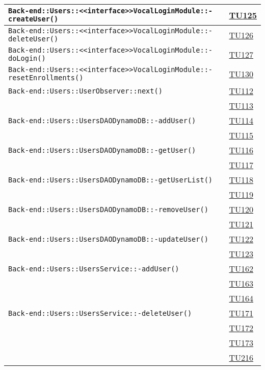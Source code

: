 \begin{longtable}{|>{\centering}m{12cm}|m{1cm}<{\centering}|}
\texttt{Back-end::Users::<<interface>>VocalLoginModule::-\linebreak createUser()} & \hyperlink{TU125}{TU125}\\ \hline
\texttt{Back-end::Users::<<interface>>VocalLoginModule::-\linebreak deleteUser()} & \hyperlink{TU126}{TU126}\\ \hline
\texttt{Back-end::Users::<<interface>>VocalLoginModule::-\linebreak doLogin()} & \hyperlink{TU127}{TU127}\\ \hline
\texttt{Back-end::Users::<<interface>>VocalLoginModule::-\linebreak resetEnrollments()} & \hyperlink{TU130}{TU130}\\ \hline
\texttt{Back-end::Users::UserObserver::next()} & \hyperlink{TU112}{TU112}\\ & \hyperlink{TU113}{TU113}\\ \hline
\texttt{Back-end::Users::UsersDAODynamoDB::-\linebreak addUser()} & \hyperlink{TU114}{TU114}\\ & \hyperlink{TU115}{TU115}\\ \hline
\texttt{Back-end::Users::UsersDAODynamoDB::-\linebreak getUser()} & \hyperlink{TU116}{TU116}\\ & \hyperlink{TU117}{TU117}\\ \hline
\texttt{Back-end::Users::UsersDAODynamoDB::-\linebreak getUserList()} & \hyperlink{TU118}{TU118}\\ & \hyperlink{TU119}{TU119}\\ \hline
\texttt{Back-end::Users::UsersDAODynamoDB::-\linebreak removeUser()} & \hyperlink{TU120}{TU120}\\ & \hyperlink{TU121}{TU121}\\ \hline
\texttt{Back-end::Users::UsersDAODynamoDB::-\linebreak updateUser()} & \hyperlink{TU122}{TU122}\\ & \hyperlink{TU123}{TU123}\\ \hline
\texttt{Back-end::Users::UsersService::-\linebreak addUser()} & \hyperlink{TU162}{TU162}\\ & \hyperlink{TU163}{TU163}\\ & \hyperlink{TU164}{TU164}\\ \hline
\texttt{Back-end::Users::UsersService::-\linebreak deleteUser()} & \hyperlink{TU171}{TU171}\\ & \hyperlink{TU172}{TU172}\\ & \hyperlink{TU173}{TU173}\\ & \hyperlink{TU216}{TU216}\\ \hline

\end{longtable}
